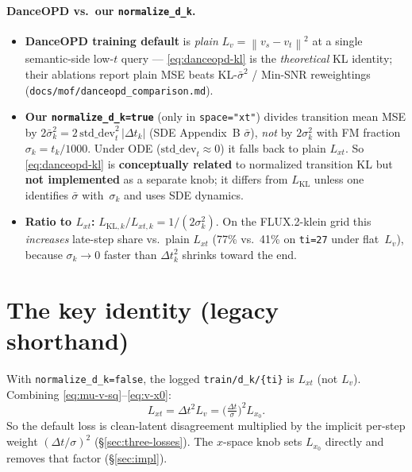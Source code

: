 \documentclass[11pt,a4paper]{article}
\newcommand{\norm}[1]{\left\lVert #1 \right\rVert}
\newcommand{\dt}{\Delta t}
\begin{document}
\paragraph{DanceOPD vs.\ our \texttt{normalize\_d\_k}.}
\begin{itemize}[leftmargin=1.5em]
\item \textbf{DanceOPD training default} is \emph{plain} $L_v=\norm{v_s-v_t}^2$ at a single
semantic-side low-$t$ query --- \eqref{eq:danceopd-kl} is the \emph{theoretical} KL identity; their
ablations report plain MSE beats KL-$\bar\sigma^2$ / Min-SNR reweightings
(\texttt{docs/mof/danceopd\_comparison.md}).
\item \textbf{Our \texttt{normalize\_d\_k=true}} (only in \texttt{space="xt"}) divides transition
mean MSE by $2\bar\sigma_k^2=2\,\mathrm{std\_dev}_t^2\,\lvert\dt_k\rvert$ (SDE Appendix~B
$\bar\sigma$), \emph{not} by $2\sigma_k^2$ with FM fraction~$\sigma_k=t_k/1000$. Under ODE
($\mathrm{std\_dev}_t\approx0$) it falls back to plain $L_{xt}$. So \eqref{eq:danceopd-kl} is
\textbf{conceptually related} to normalized transition KL but \textbf{not implemented} as a separate
knob; it differs from $L_{\mathrm{KL}}$ unless one identifies $\bar\sigma$ with~$\sigma_k$ and uses
SDE dynamics.
\item \textbf{Ratio to $L_{xt}$:} $L_{\mathrm{KL},k}/L_{xt,k}=1/(2\sigma_k^2)$. On the FLUX.2-klein
grid this \emph{increases} late-step share vs.\ plain $L_{xt}$ (77\% vs.\ 41\% on \texttt{ti=27}
under flat~$L_v$), because $\sigma_k\to0$ faster than $\dt_k^2$ shrinks toward the end.
\end{itemize}

\section{The key identity (legacy shorthand)}
\label{sec:identity}

With \texttt{normalize\_d\_k=false}, the logged \verb|train/d_k/{ti}| is $L_{xt}$ (not $L_v$).
Combining \eqref{eq:mu-v-sq}--\eqref{eq:v-x0}:
\[
L_{xt} = \dt^2 L_v = \Big(\tfrac{\dt}{\sigma}\Big)^2 L_{x_0}.
\]
So the default loss is clean-latent disagreement multiplied by the implicit per-step weight
$(\dt/\sigma)^2$ (\S\ref{sec:three-losses}). The $x$-space knob sets $L_{x_0}$ directly and removes
that factor (\S\ref{sec:impl}).

\end{document}
